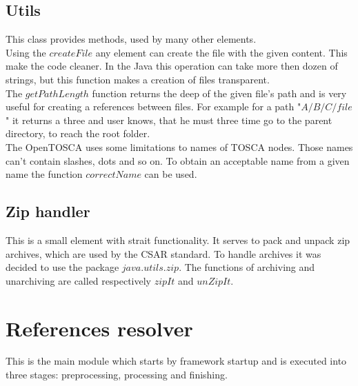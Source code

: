 \subsection*{Utils}
This class provides methods, used by many other elements.\\
Using the $createFile$ any element can create the file with the given content.
This make the code cleaner. 
In the Java this operation can take more then dozen of strings, but this function makes a creation of files transparent.\\
The $getPathLength$ function returns the deep of the given file's path and is very useful for creating a references between files.
For example for a path "$A/B/C/file$" it returns a three and user knows, that he must three time go to the parent directory, to reach the root folder.\\
The OpenTOSCA uses some limitations to names of TOSCA nodes. 
Those names can't contain slashes, dots and so on.
To obtain an acceptable name from a given name the function $correctName$ can be used.

\subsection*{Zip handler}
This is a small element with strait functionality. 
It serves to pack and unpack zip archives, which are used by the CSAR standard.
To handle archives it was decided to use the package $java$.$utils$.$zip$.
The functions of archiving and unarchiving are called respectively $zipIt$ and $unZipIt$. 

\section{References resolver}
This is the main module which starts by framework startup and is executed into three stages: preprocessing, processing and finishing.

